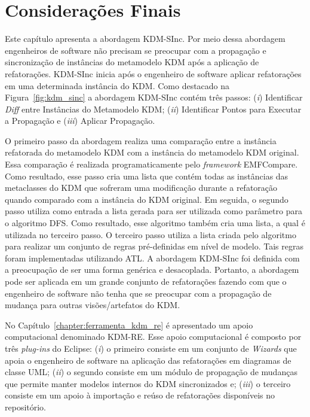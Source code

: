 \section{Considerações Finais}\label{sec:consideracoes_finals_kdm_sinc}

Este capítulo apresenta a abordagem KDM-SInc. Por meio dessa abordagem engenheiros de software não precisam se preocupar com a propagação e sincronização de instâncias do metamodelo KDM após a aplicação de refatorações. KDM-SInc inicia após o engenheiro de software aplicar refatorações em uma determinada instância do KDM. Como destacado na Figura~\ref{fig:kdm_sinc} a abordagem KDM-SInc contém três passos: (\textit{i}) Identificar \textit{Diff} entre Instâncias do Metamodelo KDM; (\textit{ii}) Identificar Pontos para Executar a Propagação e (\textit{iii}) Aplicar Propagação.

O primeiro passo da abordagem realiza uma comparação entre a instância refatorada do metamodelo KDM com a instância do metamodelo KDM original. Essa comparação é realizada programaticamente pelo \textit{framework} EMFCompare. Como resultado, esse passo cria uma lista que contém todas as instâncias das metaclasses do KDM que sofreram uma modificação durante a refatoração quando comparado com a instância do KDM original. Em seguida, o segundo passo utiliza como entrada a lista gerada para ser utilizada como parâmetro para o algoritmo DFS. Como resultado, esse algoritmo também cria uma lista, a qual é utilizada no terceiro passo. O terceiro passo utiliza a lista criada pelo algoritmo para realizar um conjunto de regras pré-definidas em nível de modelo. Tais regras foram implementadas utilizando ATL. A abordagem KDM-SInc foi definida com a preocupação de ser uma forma genérica e desacoplada. Portanto, a abordagem pode ser aplicada em um grande conjunto de refatorações fazendo com que o engenheiro de software não tenha que se preocupar com a propagação de mudança para outras visões/artefatos do KDM. 

No Capítulo~\ref{chapter:ferramenta_kdm_re} é apresentado um apoio computacional denominado KDM-RE. Esse apoio computacional é composto por três \textit{plug-ins} do Eclipse: (\textit{i}) o primeiro consiste em um conjunto de \textit{Wizards} que apoia o engenheiro de software na aplicação das refatorações em diagramas de classe UML; (\textit{ii}) o segundo consiste em um módulo de propagação de mudanças que permite manter modelos internos do KDM sincronizados e; (\textit{iii}) o terceiro consiste em um apoio à importação e reúso de refatorações disponíveis no repositório.
